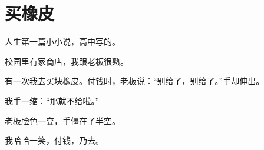 \newpage
\chapter{买橡皮}
\begin{quoting}
人生第一篇小小说，高中写的。
\end{quoting}

校园里有家商店，我跟老板很熟。

有一次我去买块橡皮。付钱时，老板说：“别给了，别给了。”手却伸出。

我手一缩：“那就不给啦。”

老板脸色一变，手僵在了半空。

我哈哈一笑，付钱，乃去。

